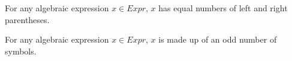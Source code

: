 \begin{thm}
For any algebraic expression $x \in Expr$, $x$ has equal numbers of left and right parentheses.
\end{thm}

\begin{thm}
For any algebraic expression $x \in Expr$, $x$ is made up of an odd number of symbols.
\end{thm}
